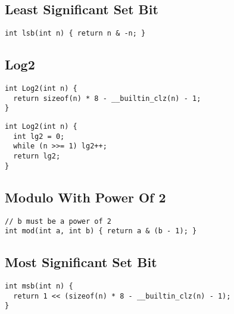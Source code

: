 \documentclass[twoside]{article}
\newcommand{\fileTitleStyle}{\large\underline}
\begin{document}
\begin{multicols*}{2}
\subsectionfont{\centering\bfseries\LARGE}
\subsectionfont{\fileTitleStyle}
\subsection*{Least Significant Set Bit}
\begin{verbatim}
int lsb(int n) { return n & -n; }
\end{verbatim}

\subsectionfont{\centering\bfseries\LARGE}
\subsectionfont{\fileTitleStyle}
\subsection*{Log2}
\begin{verbatim}
int Log2(int n) {
  return sizeof(n) * 8 - __builtin_clz(n) - 1;
}
\end{verbatim}
\vspace{-12pt}
\begin{verbatim}
int Log2(int n) {
  int lg2 = 0;
  while (n >>= 1) lg2++;
  return lg2;
}
\end{verbatim}

\subsectionfont{\centering\bfseries\LARGE}
\subsectionfont{\fileTitleStyle}
\subsection*{Modulo With Power Of 2}
\begin{verbatim}
// b must be a power of 2
int mod(int a, int b) { return a & (b - 1); }
\end{verbatim}

\subsectionfont{\centering\bfseries\LARGE}
\subsectionfont{\fileTitleStyle}
\subsection*{Most Significant Set Bit}
\begin{verbatim}
int msb(int n) {
  return 1 << (sizeof(n) * 8 - __builtin_clz(n) - 1);
}
\end{verbatim}

\subsectionfont{\centering\bfseries\LARGE}
\subsectionfont{\fileTitleStyle}

\end{multicols*}
\end{document}
